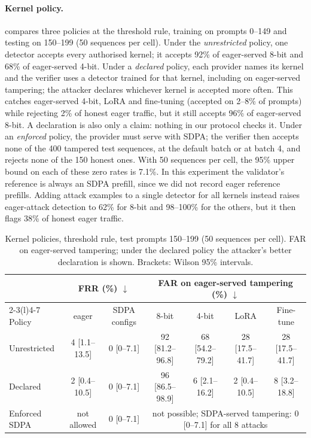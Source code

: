 \documentclass[11pt]{article}
\newcommand{\down}{$\downarrow$}
\newcommand{\ci}[2]{{\scriptsize[#1--#2]}}
\begin{document}
\paragraph{Kernel policy.}
 compares three policies at the threshold rule, training on prompts 0--149 and testing on 150--199 (50 sequences per cell).
Under the \emph{unrestricted} policy, one detector accepts every authorised kernel; it accepts 92\% of eager-served 8-bit and 68\% of eager-served 4-bit.
Under a \emph{declared} policy, each provider names its kernel and the verifier uses a detector trained for that kernel, including on eager-served tampering; the attacker declares whichever kernel is accepted more often.
This catches eager-served 4-bit, LoRA and fine-tuning (accepted on 2--8\% of prompts) while rejecting 2\% of honest eager traffic, but it still accepts 96\% of eager-served 8-bit.
A declaration is also only a claim: nothing in our protocol checks it.
Under an \emph{enforced} policy, the provider must serve with SDPA; the verifier then accepts none of the 400 tampered test sequences, at the default batch or at batch 4, and rejects none of the 150 honest ones.
With 50 sequences per cell, the 95\% upper bound on each of these zero rates is 7.1\%.
In this experiment the validator's reference is always an SDPA prefill, since we did not record eager reference prefills.
Adding attack examples to a single detector for all kernels instead raises eager-attack detection to 62\% for 8-bit and 98--100\% for the others, but it then flags 38\% of honest eager traffic.

\begin{table}[!htb]
\centering
\small
\caption{Kernel policies, threshold rule, test prompts 150--199 (50 sequences per cell). FAR on eager-served tampering; under the declared policy the attacker's better declaration is shown. Brackets: Wilson 95\% intervals.}
\label{tab:policy}
\setlength{\tabcolsep}{3.5pt}
\begin{tabular}{@{}lcccccc@{}}
\toprule
 & \multicolumn{2}{c}{FRR (\%) \down} & \multicolumn{4}{c}{FAR on eager-served tampering (\%) \down} \\
\cmidrule(lr){2-3}\cmidrule(l){4-7}
Policy & eager & SDPA configs & 8-bit & 4-bit & LoRA & Fine-tune \\
\midrule
Unrestricted & 4 \ci{1.1}{13.5} & 0 \ci{0}{7.1} & 92 \ci{81.2}{96.8} & 68 \ci{54.2}{79.2} & 28 \ci{17.5}{41.7} & 28 \ci{17.5}{41.7} \\
Declared     & 2 \ci{0.4}{10.5} & 0 \ci{0}{7.1} & 96 \ci{86.5}{98.9} & 6 \ci{2.1}{16.2} & 2 \ci{0.4}{10.5} & 8 \ci{3.2}{18.8} \\
Enforced SDPA & not allowed & 0 \ci{0}{7.1} & \multicolumn{4}{c}{not possible; SDPA-served tampering: 0 \ci{0}{7.1} for all 8 attacks} \\
\bottomrule
\end{tabular}
\end{table}
\end{document}
